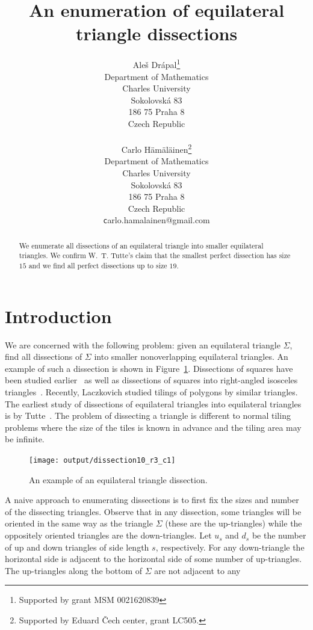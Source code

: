 \documentclass[12pt,amstags,fleqn]{article}
\title{An enumeration of equilateral triangle dissections}
\author{\Large 
Ale\v s Dr\'apal\footnote{Supported by grant MSM 0021620839}\\
Department of Mathematics \\ Charles University \\ Sokolovsk\'a 83 \\ 186 75 Praha 8 \\ Czech Republic \\
~ \\
Carlo H\"{a}m\"{a}l\"{a}inen\footnote{Supported by Eduard \v Cech center, grant LC505.}  \\
Department of Mathematics \\ Charles University \\ Sokolovsk\'a 83 \\ 186 75 Praha 8 \\ Czech Republic \\
{\texttt carlo.hamalainen@gmail.com}\\
%
}
\theoremstyle{plain}
\theoremstyle{definition}
\theoremstyle{definition}
\begin{document}
\maketitle

\begin{abstract}
We enumerate all dissections of an equilateral triangle into smaller
equilateral triangles. We confirm W.~T. Tutte's claim that the
smallest perfect dissection has size $15$ and we find all perfect
dissections up to size $19$.
\end{abstract}

\section{Introduction}

We are concerned with the following problem: given an equilateral
triangle $\Sigma$, find all dissections of $\Sigma$ into smaller
nonoverlapping equilateral triangles. An example of such a dissection
is shown in Figure~\ref{exDissection}.
Dissections of squares have been studied earlier~\cite{MR0003040}
as well as dissections of squares into right-angled isosceles
triangles~\cite{MR1794696}. Recently, 
Laczkovich\cite{MR1092545} studied tilings of polygons by similar
triangles. The earliest study of dissections of equilateral triangles
into equilateral triangles is by Tutte~\cite{MR0027521}. The problem of
dissecting a triangle is
different to normal tiling problems where the size of the tiles is known
in advance and the tiling area may be infinite.
\begin{figure}[hbt]
\begin{center}
\texttt{[image: output/dissection10\_r3\_c1]}
\end{center}
\caption{An example of an equilateral triangle dissection.}
\label{exDissection}
\end{figure}
A naive approach to enumerating dissections is to first fix the sizes and
number of
the dissecting triangles. Observe that in any dissection, some triangles
will be oriented in the same way as the triangle $\Sigma$ (these are the
up-triangles) while the oppositely oriented triangles are the down-triangles.
Let $u_{s}$ and $d_{s}$ be the number of up and down triangles of side
length $s$, respectively. For any down-triangle the horizontal side is
adjacent to the horizontal side of some number of up-triangles. The
up-triangles along the bottom of $\Sigma$ are not adjacent to any
\end{document}

